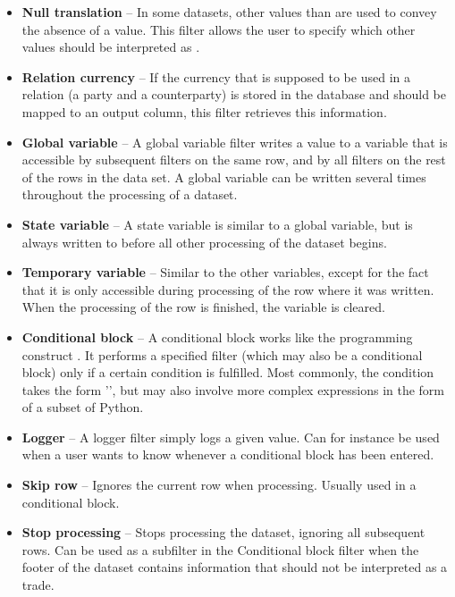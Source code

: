 \begin{itemize}
\item \textbf{Null translation} --
In some datasets, other values than  are used to convey the absence of a value. This filter allows the user to specify which other values
should be interpreted as .

\item \textbf{Relation currency} --
If the currency that is supposed to be used in a relation (a party and a counterparty) is stored in the database and should be mapped to an output column, this
filter retrieves this information.

\item \textbf{Global variable} --
A global variable filter writes a value to a variable that is accessible by subsequent filters on the same row, and by all filters on the rest of the rows in the data
set. A global variable can be written several times throughout the processing of a dataset.

\item \textbf{State variable} --
A state variable is similar to a global variable, but is always written to before all other processing of the dataset begins.

\item \textbf{Temporary variable} --
Similar to the other variables, except for the fact that it is only accessible during processing of the row where it was written. When the 
processing of the row is finished, the variable is cleared.

\item \textbf{Conditional block} --
A conditional block works like the programming construct . It performs a specified filter (which may also be a conditional block) only if a certain
condition is fulfilled. Most commonly, the condition takes the form '', but may also involve more complex expressions in the form of a
subset of Python.

\item \textbf{Logger} --
A logger filter simply logs a given value. Can for instance be used when a user wants to know whenever a conditional block has been entered.

\item \textbf{Skip row} --
Ignores the current row when processing. Usually used in a conditional block.

\item \textbf{Stop processing} --
Stops processing the dataset, ignoring all subsequent rows. Can be used as a subfilter in the Conditional block filter when the footer of the dataset
contains information that should not be interpreted as a trade.


\end{itemize}
